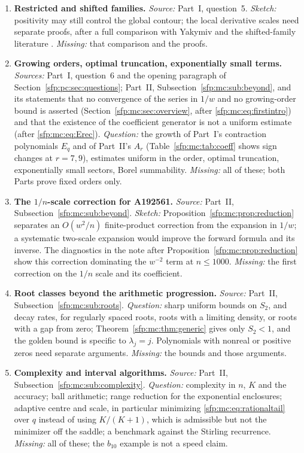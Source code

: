 \documentclass[11pt,letterpaper]{article}
\numberwithin{equation}{section}
\theoremstyle{definition}\newtheorem{definition}[theorem]{Definition}
\theoremstyle{remark}\newtheorem{remark}[theorem]{Remark}
\begin{document}
\begin{enumerate}
\item\label{sfp:q:shifted} \textbf{Restricted and shifted families.} \emph{Source:} Part~I, question~5. \emph{Sketch:} positivity may still control the global contour; the local derivative scales need separate proofs, after a full comparison with Yakymiv \cite{yakymiv} and the shifted-family literature \cite{shifted}. \emph{Missing:} that comparison and the proofs.
\item\label{sfp:q:growing} \textbf{Growing orders, optimal truncation, exponentially small terms.} \emph{Sources:} Part~I, question~6 and the opening paragraph of Section~\ref{sfp:pc:sec:questions}; Part~II, Subsection~\ref{sfp:mc:sub:beyond}, and its statements that no convergence of the series in $1/w$ and no growing-order bound is asserted (Section~\ref{sfp:mc:sec:overview}, after \eqref{sfp:mc:eq:firstintro}) and that the existence of the coefficient generator is not a uniform estimate (after \eqref{sfp:mc:eq:Erec}). \emph{Question:} the growth of Part~I's contraction polynomials $E_q$ and of Part~II's $A_r$ (Table~\ref{sfp:mc:tab:coeff} shows sign changes at $r=7,9$), estimates uniform in the order, optimal truncation, exponentially small sectors, Borel summability. \emph{Missing:} all of these; both Parts prove fixed orders only.
\item\label{sfp:q:twoscale} \textbf{The $1/n$-scale correction for A192561.} \emph{Source:} Part~II, Subsection~\ref{sfp:mc:sub:beyond}. \emph{Sketch:} Proposition~\ref{sfp:mc:prop:reduction} separates an $O(w^2/n)$ finite-product correction from the expansion in $1/w$; a systematic two-scale expansion would improve the forward formula and its inverse. The diagnostics in the note after Proposition~\ref{sfp:mc:prop:reduction} show this correction dominating the $w^{-2}$ term at $n\le1000$. \emph{Missing:} the first correction on the $1/n$ scale and its coefficient.
\item\label{sfp:q:roots} \textbf{Root classes beyond the arithmetic progression.} \emph{Source:} Part~II, Subsection~\ref{sfp:mc:sub:roots}. \emph{Question:} sharp uniform bounds on $S_2$, and decay rates, for regularly spaced roots, roots with a limiting density, or roots with a gap from zero; Theorem~\ref{sfp:mc:thm:generic} gives only $S_2<1$, and the golden bound is specific to $\lambda_j=j$. Polynomials with nonreal or positive zeros need separate arguments. \emph{Missing:} the bounds and those arguments.
\item\label{sfp:q:complexity} \textbf{Complexity and interval algorithms.} \emph{Source:} Part~II, Subsection~\ref{sfp:mc:sub:complexity}. \emph{Question:} complexity in $n$, $K$ and the accuracy; ball arithmetic; range reduction for the exponential enclosures; adaptive centre and scale, in particular minimizing \eqref{sfp:mc:eq:rationaltail} over $q$ instead of using $K/(K+1)$, which is admissible but not the minimizer off the saddle; a benchmark against the Stirling recurrence. \emph{Missing:} all of these; the $b_{10}$ example is not a speed claim.

\end{enumerate}
\end{document}
